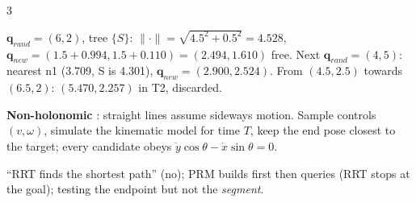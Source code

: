 \begin{multicols}{3}
\begin{fbx}
\end{fbx}
\begin{worked}[SAMPLE 6b: RRT, practical map, $\delta=1$]
$\mathbf q_{rand}=(6,2)$, tree $\{S\}$: $\lVert\cdot\rVert=\sqrt{4.5^2+0.5^2}=4.528$, $\mathbf q_{new}=(1.5+0.994,1.5+0.110)=(\mathbf{2.494},\mathbf{1.610})$ free. Next $\mathbf q_{rand}=(4,5)$: nearest n1 (3.709, S is 4.301), $\mathbf q_{new}=(\mathbf{2.900},\mathbf{2.524})$. From $(4.5,2.5)$ towards $(6.5,2)$: $(5.470,2.257)$ in T2, discarded. \chk
\end{worked}
\textbf{Non-holonomic} : straight lines assume sideways motion. Sample controls $(v,\omega)$, simulate the kinematic model for time $T$, keep the end pose closest to the target; every candidate obeys $\dot y\cos\theta-\dot x\sin\theta=0$.
\begin{trap}
``RRT finds the shortest path'' (no); PRM builds first then queries (RRT stops at the goal); testing the endpoint but not the \emph{segment}.
\end{trap}


\end{multicols}
